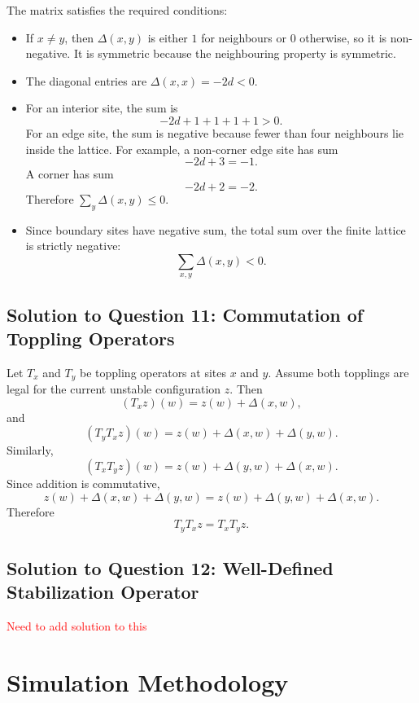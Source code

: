 \documentclass[11pt]{article}
\newcommand\myworries[1]{\textcolor{red}{#1}}
\begin{document}
The matrix satisfies the required conditions:

\begin{itemize}
    \item If \(x\neq y\), then \(\Delta(x,y)\) is either \(1\) for neighbours or \(0\) otherwise, so it is non-negative. 
    It is symmetric because the neighbouring property is symmetric.

    \item The diagonal entries are \(\Delta(x,x)=-2d<0\).

    \item For an interior site, the sum is
    \[
        -2d+1+1+1+1>0.
    \]
    For an edge site, the sum is negative because fewer than four neighbours lie inside the lattice. 
    For example, a non-corner edge site has sum
    \[
        -2d+3=-1.
    \]
    A corner has sum
    \[
        -2d+2=-2.
    \]
    Therefore \(\sum_y \Delta(x,y)\leq 0\).

    \item Since boundary sites have negative sum, the total sum over the finite lattice is strictly negative:
    \[
        \sum_{x,y}\Delta(x,y)<0.
    \]
\end{itemize}

\subsection{Solution to Question 11: Commutation of Toppling Operators}

Let \(T_x\) and \(T_y\) be toppling operators at sites \(x\) and \(y\). 
Assume both topplings are legal for the current unstable configuration \(z\). 
Then
\[
    (T_xz)(w)=z(w)+\Delta(x,w),
\]
and
\[
    (T_yT_xz)(w)
    =
    z(w)+\Delta(x,w)+\Delta(y,w).
\]
Similarly,
\[
    (T_xT_yz)(w)
    =
    z(w)+\Delta(y,w)+\Delta(x,w).
\]
Since addition is commutative,
\[
    z(w)+\Delta(x,w)+\Delta(y,w)
    =
    z(w)+\Delta(y,w)+\Delta(x,w).
\]
Therefore
\[
    T_yT_xz=T_xT_yz.
\]


\subsection{Solution to Question 12: Well-Defined Stabilization Operator}

\myworries{Need to add solution to this}


\section{Simulation Methodology}
\end{document}
